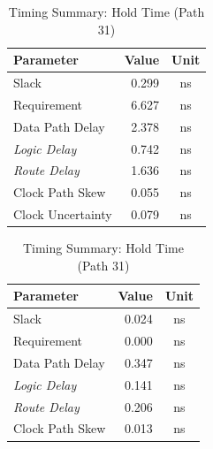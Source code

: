 \documentclass[11pt]{article}
\begin{document}
\begin{table}[H]
    \centering 
    \begin{minipage}[b]{0.48\textwidth}
        \flushleft
        \captionsetup{type=table, singlelinecheck=false, justification=raggedright, skip=2pt}
        \caption{Timing Summary: Setup Time (Path 21)}
        \label{tab:setup_report}
        \small
        \begin{tabular}{lrc}
            \toprule
            \textbf{Parameter} & \textbf{Value} & \textbf{Unit} \\
            \midrule
            Slack             & 0.299 & ns \\
            Requirement       & 6.627 & ns \\
            Data Path Delay   & 2.378 & ns \\
            \quad \textit{Logic Delay} & 0.742 & ns \\
            \quad \textit{Route Delay} & 1.636 & ns \\
            Clock Path Skew   & 0.055 & ns \\
            Clock Uncertainty & 0.079 & ns \\
            \bottomrule
        \end{tabular}
    \end{minipage}%
    \hfill 
    \begin{minipage}[b]{0.48\textwidth}
        \flushleft
        \captionsetup{type=table, singlelinecheck=false, justification=raggedright, skip=2pt}
        \caption{Timing Summary: Hold Time (Path 31)}
        \label{tab:hold_report}
        \small
        \begin{tabular}{lrc}
            \toprule
            \textbf{Parameter} & \textbf{Value} & \textbf{Unit} \\
            \midrule
            Slack             & 0.024 & ns \\
            Requirement       & 0.000 & ns \\
            Data Path Delay   & 0.347 & ns \\
            \quad \textit{Logic Delay} & 0.141 & ns \\
            \quad \textit{Route Delay} & 0.206 & ns \\
            Clock Path Skew   & 0.013 & ns \\
            \bottomrule
        \end{tabular}
    \end{minipage}
    
\end{table}
\end{document}
